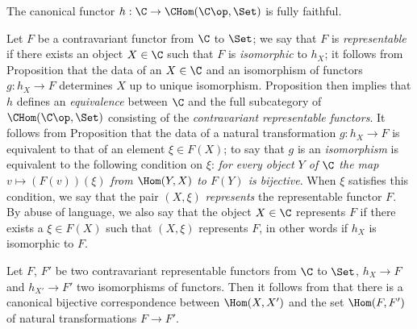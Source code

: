 \begin{proposition}[8.1.7]
\label{0.8.1.7}
The canonical functor $h:\C\to\CHom(\C\op,\Set)$ is fully faithful.
\end{proposition}

\begin{env}[8.1.8]
\label{0.8.1.8}
Let $F$ be a contravariant functor from $\C$ to $\Set$; we say that $F$ is \emph{representable} if there
exists an object $X\in\C$ such that $F$ is \emph{isomorphic} to $h_X$; it follows from
Proposition  that the data of an $X\in\C$ and an isomorphism of functors
$g:h_X\to F$ determines $X$ up to unique isomorphism. Proposition  then
implies that $h$ defines an \emph{equivalence} between $\C$ and the full subcategory of
$\CHom(\C\op,\Set)$ consisting of the \emph{contravariant representable functors}. It follows from
Proposition  that the data of a natural transformation $g:h_X\to F$ is
equivalent to that of an element $\xi\in F(X)$; to say that $g$ is an \emph{isomorphism} is
equivalent to the following condition on $\xi$: \emph{for every object $Y$ of $\C$ the map
$v\mapsto(F(v))(\xi)$ from $\Hom(Y,X)$ to $F(Y)$ is bijective}. When $\xi$ satisfies this condition,
we say that the pair $(X,\xi)$ \emph{represents} the representable functor $F$. By abuse of language,
we also say that the object $X\in\C$ represents $F$ if there exists a $\xi\in F(X)$ such that
$(X,\xi)$ represents $F$, in other words if $h_X$ is isomorphic to $F$.

Let $F$, $F'$ be two contravariant representable functors from $\C$ to $\Set$, $h_X\to F$ and
$h_{X'}\to F'$ two isomorphisms of functors. Then it follows from  that
there is a canonical bijective correspondence between $\Hom(X,X')$ and the set $\Hom(F,F')$ of
natural transformations $F\to F'$.
\end{env}

